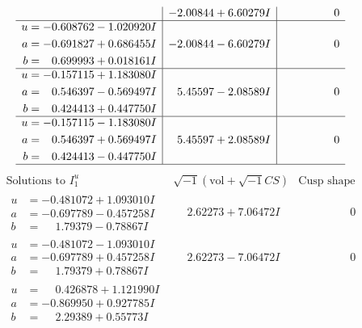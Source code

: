 \documentclass[1p]{elsarticle_modified}
\theoremstyle{definition}
\newcommand{\I}{\sqrt{-1}}
\begin{document}
$$\begin{array}{c|c|c}
 & -2.00844 + 6.60279 I & \phantom{-0.000000 } 0 \\ \hline\begin{aligned}
u &= -0.608762 - 1.020920 I \\
a &= -0.691827 + 0.686455 I \\
b &= \phantom{-}0.699993 + 0.018161 I\end{aligned}
 & -2.00844 - 6.60279 I & \phantom{-0.000000 } 0 \\ \hline\begin{aligned}
u &= -0.157115 + 1.183080 I \\
a &= \phantom{-}0.546397 - 0.569497 I \\
b &= \phantom{-}0.424413 + 0.447750 I\end{aligned}
 & \phantom{-}5.45597 - 2.08589 I & \phantom{-0.000000 } 0 \\ \hline\begin{aligned}
u &= -0.157115 - 1.183080 I \\
a &= \phantom{-}0.546397 + 0.569497 I \\
b &= \phantom{-}0.424413 - 0.447750 I\end{aligned}
 & \phantom{-}5.45597 + 2.08589 I & \phantom{-0.000000 } 0\\
 \hline 
 \end{array}$$\newpage$$\begin{array}{c|c|c}  
\text{Solutions to }I^u_{1}& \I (\text{vol} + \sqrt{-1}CS) & \text{Cusp shape}\\
 \hline 
\begin{aligned}
u &= -0.481072 + 1.093010 I \\
a &= -0.697789 - 0.457258 I \\
b &= \phantom{-}1.79379 - 0.78867 I\end{aligned}
 & \phantom{-}2.62273 + 7.06472 I & \phantom{-0.000000 } 0 \\ \hline\begin{aligned}
u &= -0.481072 - 1.093010 I \\
a &= -0.697789 + 0.457258 I \\
b &= \phantom{-}1.79379 + 0.78867 I\end{aligned}
 & \phantom{-}2.62273 - 7.06472 I & \phantom{-0.000000 } 0 \\ \hline\begin{aligned}
u &= \phantom{-}0.426878 + 1.121990 I \\
a &= -0.869950 + 0.927785 I \\
b &= \phantom{-}2.29389 + 0.55773 I\end{aligned}

\end{array}$$
\end{document}
